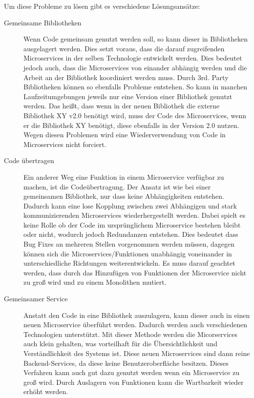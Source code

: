 Um diese Probleme zu lösen gibt es verschiedene Lösungsansätze: \begin{description}
	\item [Gemeinsame Bibliotheken] Wenn Code gemeinsam genutzt werden soll, so kann dieser in Bibliotheken ausgelagert werden. Dies setzt voraus, dass die darauf zugreifenden Microservices in der selben Technologie entwickelt werden. \newline
	Dies bedeutet jedoch auch, dass die Microservices von einander abhängig werden und die Arbeit an der Bibliothek koordiniert werden muss. \newline
	Durch 3rd. Party Bibliotheken können so ebenfalls Probleme entstehen. So kann in manchen Laufzeitumgebungen jeweils nur eine Version einer Bibliothek genutzt werden. Das heißt, dass wenn in der neuen Bibliothek die externe Bibliothek XY v2.0 benötigt wird, muss der Code des Microservices, wenn er die Bibliothek XY benötigt, diese ebenfalls in der Version 2.0 nutzen. \newline
	Wegen diesen Problemen wird eine Wiederverwendung von Code in Microservices nicht forciert.
	\item [Code übertragen] Ein anderer Weg eine Funktion in einem Microservice verfügbar zu machen, ist die Codeübertragung. Der Ansatz ist wie bei einer gemeinsamen Bibliothek, nur dass keine Abhängigkeiten entstehen. Dadurch kann eine lose Kopplung zwischen zwei Abhängigen und stark kommunizierenden Microservices wiederhergestellt werden. Dabei spielt es keine Rolle ob der Code im ursprünglichem Microservice bestehen bleibt oder nicht, wodurch jedoch Redundanzen entstehen. Dies bedeutet dass Bug Fixes an mehreren Stellen vorgenommen werden müssen, dagegen können sich die Microservices/Funktionen unabhängig voneinander in unterschiedliche Richtungen weiterentwickeln. \newline
	Es muss darauf geachtet werden, dass durch das Hinzufügen von Funktionen der Microservice nicht zu groß wird und zu einem Monolithen mutiert.
	\item[Gemeinsamer Service] Anstatt den Code in eine Bibliothek auszulagern, kann dieser auch in einen neuen Microservice überführt werden. Dadurch werden auch verschiedenen Technologien unterstützt. Mit dieser Methode werden die Micorservices auch klein gehalten, was vorteilhaft für die Übersichtlichkeit und Verständlichkeit des Systems ist. Diese neuen Microservices sind dann reine Backend-Services, da diese keine Benutzeroberfläche besitzen. \newline
	Dieses Verfahren kann auch gut dazu genutzt werden wenn ein Microservice zu groß wird. Durch Auslagern von Funktionen kann die Wartbarkeit wieder erhöht werden.

\end{description}
